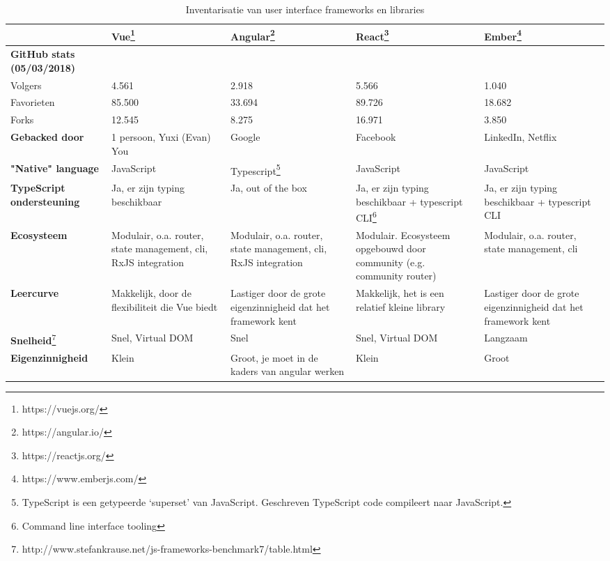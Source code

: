 \begin{table}[htb]
    \centering
    \begin{tabular}{ l | p{2.5cm} p{2.5cm} p{2.5cm} p{2.5cm} }
    & \textbf{Vue}\footnote{https://vuejs.org/} & \textbf{Angular}\footnote{https://angular.io/} & \textbf{React}\footnote{https://reactjs.org/} & \textbf{Ember}\footnote{https://www.emberjs.com/}\\
    \hline
    \textbf{GitHub stats (05/03/2018)} & & &\\
    Volgers & 4.561 & 2.918 & 5.566 & 1.040\\
    Favorieten & 85.500 & 33.694 & 89.726 & 18.682\\
    Forks & 12.545 & 8.275 & 16.971 & 3.850\\
    \textbf{Gebacked door} & 1 persoon, Yuxi (Evan) You &Google & Facebook & LinkedIn, Netflix\\
    \textbf{"Native" language} & JavaScript & Typescript\footnote{TypeScript is een getypeerde ‘superset’ van JavaScript. Geschreven TypeScript code compileert naar JavaScript.} & JavaScript & JavaScript\\
    \textbf{TypeScript ondersteuning} & Ja, er zijn typing beschikbaar &Ja, out of the box & Ja, er zijn typing beschikbaar + typescript CLI\footnote{Command line interface tooling} & Ja, er zijn typing beschikbaar + typescript CLI\\
    \textbf{Ecosysteem} & Modulair, o.a. router, state management, cli, RxJS integration & Modulair, o.a. router, state management, cli, RxJS integration &	Modulair. Ecosysteem opgebouwd door community (e.g. community router) & Modulair, o.a. router, state management, cli\\
    \textbf{Leercurve} & \cellcolor{green!15}Makkelijk, door de flexibiliteit die Vue biedt & \cellcolor{red!25}Lastiger door de grote eigenzinnigheid dat het framework kent & \cellcolor{green!15}Makkelijk, het is een relatief kleine library & \cellcolor{red!25}Lastiger door de grote eigenzinnigheid dat het framework kent\\
    \textbf{Snelheid}\footnote{http://www.stefankrause.net/js-frameworks-benchmark7/table.html} & \cellcolor{green!15}Snel, Virtual DOM & \cellcolor{green!15}Snel & \cellcolor{green!15}Snel, Virtual DOM & \cellcolor{red!25}Langzaam\\
    \textbf{Eigenzinnigheid} & \cellcolor{green!15}Klein & \cellcolor{red!25}Groot, je moet in de kaders van angular werken & \cellcolor{green!15}Klein & \cellcolor{red!25}Groot\\
    \end{tabular}
    \caption[]{Inventarisatie van user interface frameworks en libraries \footnotemark}
    \label{tab:uiframeworks}
\end{table}

